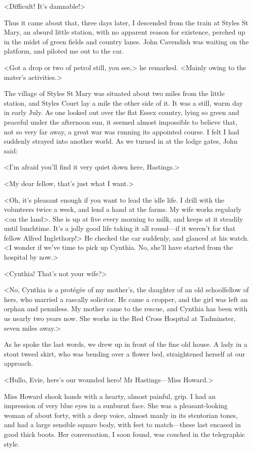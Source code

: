  <Difficult! It's damnable!> 

 Thus it came about that, three days later, I descended from the train at Styles St Mary, an absurd little station, with no apparent reason for existence, perched up in the midst of green fields and country lanes. John Cavendish was waiting on the platform, and piloted me out to the car. 

 <Got a drop or two of petrol still, you see,> he remarked. <Mainly owing to the mater's activities.> 

 The village of Styles St Mary was situated about two miles from the little station, and Styles Court lay a mile the other side of it. It was a still, warm day in early July. As one looked out over the flat Essex country, lying so green and peaceful under the afternoon sun, it seemed almost impossible to believe that, not so very far away, a great war was running its appointed course. I felt I had suddenly strayed into another world. As we turned in at the lodge gates, John said: 

 <I'm afraid you'll find it very quiet down here, Hastings.> 

 <My dear fellow, that's just what I want.> 

 <Oh, it's pleasant enough if you want to lead the idle life. I drill with the volunteers twice a week, and lend a hand at the farms. My wife works regularly <on the land>. She is up at five every morning to milk, and keeps at it steadily until lunchtime. It's a jolly good life taking it all round—if it weren't for that fellow Alfred Inglethorp!> He checked the car suddenly, and glanced at his watch. <I wonder if we've time to pick up Cynthia. No, she'll have started from the hospital by now.> 

 <Cynthia! That's not your wife?> 

 <No, Cynthia is a protégée of my mother's, the daughter of an old schoolfellow of hers, who married a rascally solicitor. He came a cropper, and the girl was left an orphan and penniless. My mother came to the rescue, and Cynthia has been with us nearly two years now. She works in the Red Cross Hospital at Tadminster, seven miles away.> 

 As he spoke the last words, we drew up in front of the fine old house. A lady in a stout tweed skirt, who was bending over a flower bed, straightened herself at our approach. 

 <Hullo, Evie, here's our wounded hero! Mr Hastings—Miss Howard.> 

 Miss Howard shook hands with a hearty, almost painful, grip. I had an impression of very blue eyes in a sunburnt face. She was a pleasant-looking woman of about forty, with a deep voice, almost manly in its stentorian tones, and had a large sensible square body, with feet to match—these last encased in good thick boots. Her conversation, I soon found, was couched in the telegraphic style. 

